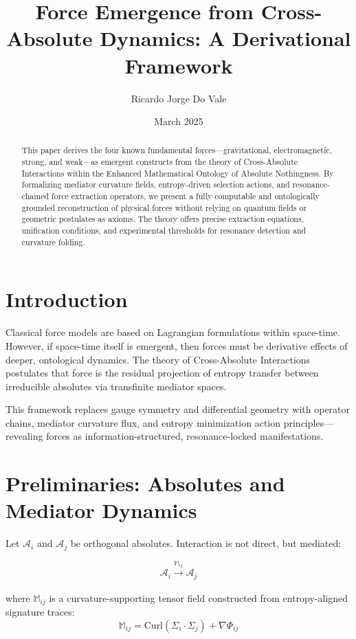 \documentclass[11pt]{article}
\title{\textbf{Force Emergence from Cross-Absolute Dynamics: A Derivational Framework}}
\author[1]{Ricardo Jorge Do Vale}
\affil[1]{RJV Technologies Ltd — Unified Theory Division\\ \texttt{ricardo@rjv-technologies.com}}
\date{March 2025}
\begin{document}
\maketitle

\begin{abstract}
This paper derives the four known fundamental forces—gravitational, electromagnetic, strong, and weak—as emergent constructs from the theory of Cross-Absolute Interactions within the Enhanced Mathematical Ontology of Absolute Nothingness. By formalizing mediator curvature fields, entropy-driven selection actions, and resonance-chained force extraction operators, we present a fully computable and ontologically grounded reconstruction of physical forces without relying on quantum fields or geometric postulates as axioms. The theory offers precise extraction equations, unification conditions, and experimental thresholds for resonance detection and curvature folding.
\end{abstract}

\tableofcontents

\newpage

\section{Introduction}

Classical force models are based on Lagrangian formulations within space-time. However, if space-time itself is emergent, then forces must be derivative effects of deeper, ontological dynamics. The theory of Cross-Absolute Interactions postulates that force is the residual projection of entropy transfer between irreducible absolutes via transfinite mediator spaces. 

This framework replaces gauge symmetry and differential geometry with operator chains, mediator curvature flux, and entropy minimization action principles—revealing forces as information-structured, resonance-locked manifestations.

\section{Preliminaries: Absolutes and Mediator Dynamics}

Let \(\mathcal{A}_i\) and \(\mathcal{A}_j\) be orthogonal absolutes. Interaction is not direct, but mediated:

\[
\mathcal{A}_i \xrightarrow[]{\mathbb{M}_{ij}} \mathcal{A}_j
\]

where \(\mathbb{M}_{ij}\) is a curvature-supporting tensor field constructed from entropy-aligned signature traces:
\[
\mathbb{M}_{ij} = \text{Curl}(\Sigma_i \cdot \Sigma_j) + \nabla \Phi_{ij}
\]
\end{document}
